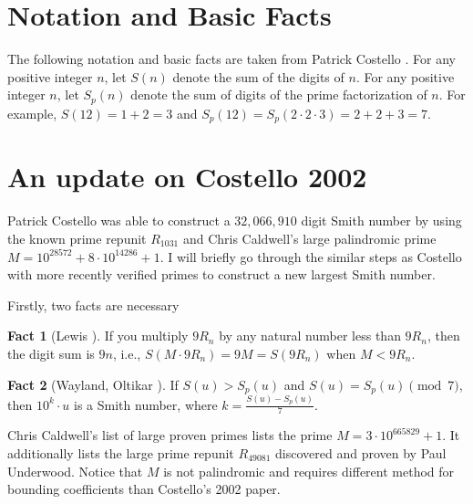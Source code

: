 \documentclass{amsart}
\newcommand{\RE}{{49081}}
\numberwithin{equation}{section}
\theoremstyle{plain} %
\theoremstyle{definition}
\newtheorem{fact}{Fact}
\theoremstyle{remark}
\begin{document}
 \section{Notation and Basic Facts}
The following notation and basic facts are taken from Patrick Costello \cite{Costello2002}. For any positive integer $n$, let $S(n)$ denote the sum of the digits of $n$. For any positive integer $n$, let $S_p(n)$ denote the sum of digits of the prime factorization of $n$. For example, $S(12) = 1 + 2 = 3$ and $S_p(12) = S_p(2\cdot 2 \cdot 3) = 2 + 2 + 3 = 7$.


 \section{An update on Costello 2002}
 Patrick Costello was able to construct a $32,066,910$ digit Smith number by using the known prime repunit $R_{1031}$ and Chris Caldwell's large palindromic prime $M = 10^{28572} + 8 \cdot 10^{14286} + 1$. I will briefly go through the similar steps as Costello with more recently verified primes to construct a new largest Smith number.

 Firstly, two facts are necessary

\begin{fact}[{Lewis \cite{Lewis1994}}]
If you multiply $9R_n$ by any natural number less than $9R_n$, then the digit sum is $9n$, i.e.,
$S(M \cdot 9R_n) = 9M = S(9R_n)$  when $M < 9R_n$.
\end{fact}

\begin{fact}[{Wayland, Oltikar \cite{OltikarWayland1983}}]
If $S(u) > S_p(u)$ and $S(u) = S_p(u) \pmod{7}$, then $10^k \cdot u$ is a Smith number, where $k =\frac{S(u)-S_p(u)}{7}$.
\end{fact}

Chris Caldwell's list of large proven primes\cite{Caldwell3} lists the prime $M=  3 \cdot 10^{665829} + 1$. It additionally lists the large prime repunit $R_\RE$ discovered and proven by Paul Underwood\cite{CaldwellR}. Notice that $M$ is not palindromic and requires different method for bounding coefficients than Costello's 2002 paper.
\end{document}
